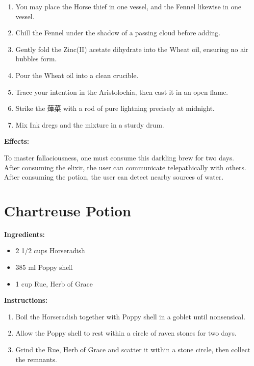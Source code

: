 \documentclass{article}
\begin{document}
\begin{enumerate}
  \item You may place the Horse thief in one vessel, and the Fennel likewise in one vessel.
  \item Chill the Fennel under the shadow of a passing cloud before adding.
  \item Gently fold the Zinc(II) acetate dihydrate into the Wheat oil, ensuring no air bubbles form.
  \item Pour the Wheat oil into a clean crucible.
  \item Trace your intention in the Aristolochia, then cast it in an open flame.
  \item Strike the 蔊菜 with a rod of pure lightning precisely at midnight.
  \item Mix Ink dregs and the mixture in a sturdy drum.
\end{enumerate}

\textbf{Effects:}

To master fallaciousness, one must consume this darkling brew for two days. After consuming the elixir, the user can communicate telepathically with others. After consuming the potion, the user can detect nearby sources of water.

\newpage
\section*{Chartreuse Potion}

\textbf{Ingredients:}

\begin{itemize}
  \item 2 1/2 cups Horseradish
  \item 385 ml Poppy shell
  \item 1 cup Rue, Herb of Grace
\end{itemize}

\textbf{Instructions:}

\begin{enumerate}
  \item Boil the Horseradish together with Poppy shell in a goblet until nonsensical.
  \item Allow the Poppy shell to rest within a circle of raven stones for two days.
  \item Grind the Rue, Herb of Grace and scatter it within a stone circle, then collect the remnants.
\end{enumerate}
\end{document}

